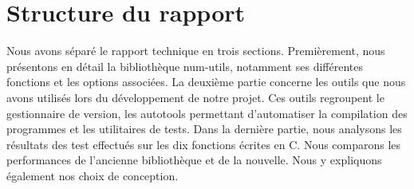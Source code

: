 \section{Structure du rapport}

Nous avons s\'epar\'e le rapport technique en trois sections.
\newline
Premi\`erement, nous pr\'esentons en d\'etail la biblioth\`eque num-utils, notamment ses diff\'erentes fonctions et les options associ\'ees.
\newline
La deuxi\`eme partie concerne les outils que nous avons utilis\'es lors du d\'eveloppement de notre projet. Ces outils regroupent le gestionnaire de version, les autotools permettant d'automatiser la compilation des programmes et les utilitaires de tests. 
\newline
Dans la derni\`ere partie, nous analysons les r\'esultats des test effectu\'es sur les dix fonctions \'ecrites en C. Nous comparons les performances de l'ancienne biblioth\`eque et de la nouvelle. Nous y expliquons \'egalement nos choix de conception.
